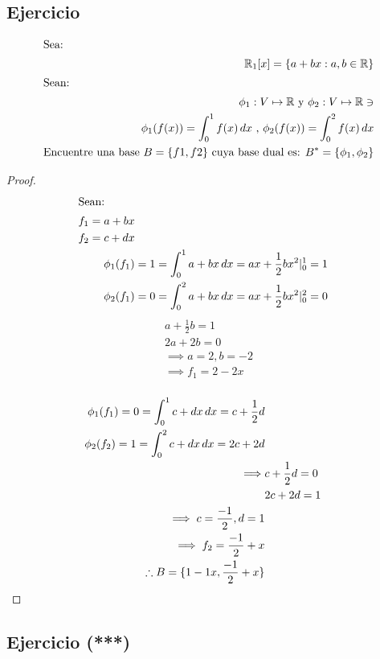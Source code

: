 \subsection{Ejercicio}

\begin{exercise}
\begin{align}
    \intertext{Sea:}
    \mathbb{R}_1 [x]=\{a+bx: a,b\in\mathbb{R}\}\\
    \intertext{Sean:}
    \phi_1: V\mapsto \mathbb{R} \text{  y  }\phi_2:V\mapsto\mathbb{R}\ni\\
    \phi_1(f(x))=\int_{0}^{1} f(x) \, d{x} \text{  ,  } \phi_2(f(x))= \int_{0}^{2} f(x) \, d{x}\\
    \text{Encuentre una base }B=\{f1,f2\} \text{ cuya base dual es: } B^* = \{\phi_1,\phi_2\} 
\end{align}
\end{exercise}

\begin{proof}
\begin{align}
    \intertext{Sean:}
    f_1= a+bx\\
    f_2= c+dx\\
    \phi_1(f_1)&=1=\int_{0}^{1} a+bx \, d{x}=ax+\frac{1}{2}bx^2 |_0^1 =1\\
    \phi_2(f_1)&=0=\int_{0}^{2} a+bx \, d{x}=ax+\frac{1}{2}bx^2 |_0^2 =0\\
\end{align}
\begin{align}
    a+\frac{1}{2}b=1\\
    2a+2b=0\\
    \implies a=2,b=-2\\
    \implies f_1 = 2-2x\\
\end{align}

\begin{align}
\phi_1(f_1)=0=\int_{0}^{1} c+dx \, d{x}=c+\frac{1}{2}d\\
\phi_2(f_2)=1=\int_{0}^{2} c+dx \, d{x}=2c+2d\\
\implies& c+\frac{1}{2}d = 0\\
&2c+2d=1\\
\implies c=\frac{-1}{2}, d=1\\
\implies f_2 = \frac{-1}{2} +x\\
\therefore B=\{1-1x,\frac{-1}{2}+x\}
\end{align}
\end{proof}

\subsection{Ejercicio (***)}

